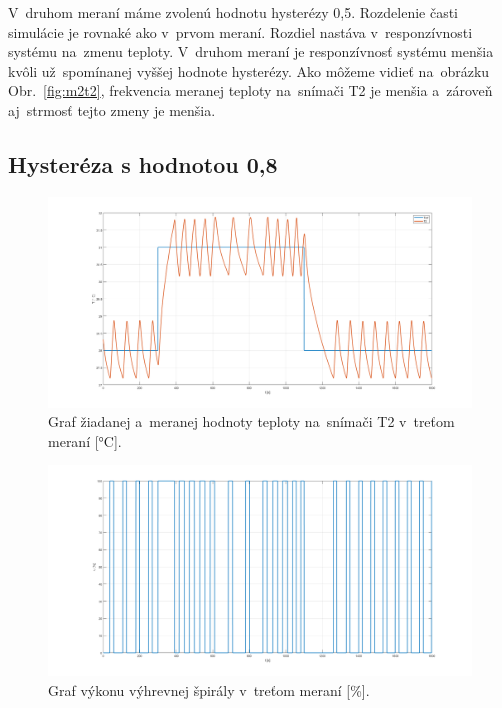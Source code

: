 \documentclass{article}
\begin{document}
V~druhom meraní máme zvolenú hodnotu hysterézy 0,5. Rozdelenie časti simulácie je rovnaké ako v~prvom meraní.
Rozdiel nastáva v~responzívnosti systému na~zmenu teploty. V~druhom meraní je responzívnosť systému menšia
kvôli už~spomínanej vyššej hodnote hysterézy. Ako môžeme vidieť na~obrázku Obr.~\ref{fig:m2t2}, frekvencia
meranej teploty na~snímači T2 je menšia a~zároveň aj~strmosť tejto zmeny je menšia.

\subsection{Hysteréza s hodnotou 0,8}
\label{sec:meranie3}

\begin{figure}[!htbp]
	\begin{center}
		\includegraphics[width=\textwidth]{./include/m3T2.png}
	\end{center}
	\caption{Graf žiadanej a~meranej hodnoty teploty na~snímači T2 v~treťom meraní [°C].}
	\label{fig:m3t2}
\end{figure}

\clearpage

\begin{figure}[!htbp]
	\begin{center}
		\includegraphics[width=\textwidth]{./include/m3u.png}
	\end{center}
	\caption{Graf výkonu výhrevnej špirály v~treťom meraní [\%].}
	\label{fig:m3u}
\end{figure}
\end{document}
